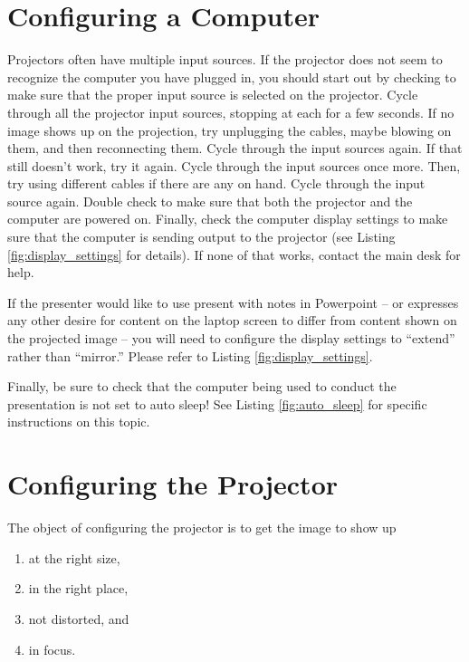 \documentclass{scrartcl}
\begin{document}
\section{Configuring a Computer} \label{sec:computer}
Projectors often have multiple input sources. If the projector does not seem to recognize the computer you have plugged in, you should start out by checking to make sure that the proper input source is selected on the projector. Cycle through all the projector input sources, stopping at each for a few seconds. If no image shows up on the projection, try unplugging the cables, maybe blowing on them, and then reconnecting them. Cycle through the input sources again. If that still doesn't work, try it again. Cycle through the input sources once more. Then, try using different cables if there are any on hand. Cycle through the input source again. Double check to make sure that both the projector and the computer are powered on. Finally, check the computer display settings to make sure that the computer is sending output to the projector (see Listing \ref{fig:display_settings} for details).  If none of that works, contact the main desk for help. 

If the presenter would like to use present with notes in Powerpoint -- or expresses any other desire for content on the laptop screen to differ from content shown on the projected image -- you will need to configure the display settings to ``extend'' rather than ``mirror.'' Please refer to Listing \ref{fig:display_settings}. 

Finally, be sure to check that the computer being used to conduct the presentation is not set to auto sleep! See Listing \ref{fig:auto_sleep} for specific instructions on this topic.

\section{Configuring the Projector} \label{sec:projector}
The object of configuring the projector is to get the image to show up 
\begin{enumerate}
  \item at the right size, \label{item:size}
  \item in the right place, \label{item:place}
  \item not distorted, and \label{item:distorted}
  \item in focus. \label{item:focus}
\end{enumerate}
\end{document}
